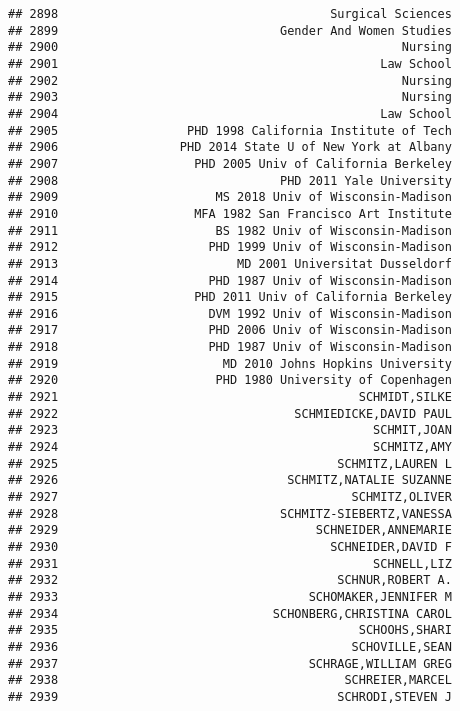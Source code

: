 \documentclass[
]{article}
\begin{document}
\begin{verbatim}
## 2898                                      Surgical Sciences
## 2899                               Gender And Women Studies
## 2900                                                Nursing
## 2901                                             Law School
## 2902                                                Nursing
## 2903                                                Nursing
## 2904                                             Law School
## 2905                  PHD 1998 California Institute of Tech
## 2906                 PHD 2014 State U of New York at Albany
## 2907                   PHD 2005 Univ of California Berkeley
## 2908                               PHD 2011 Yale University
## 2909                      MS 2018 Univ of Wisconsin-Madison
## 2910                   MFA 1982 San Francisco Art Institute
## 2911                      BS 1982 Univ of Wisconsin-Madison
## 2912                     PHD 1999 Univ of Wisconsin-Madison
## 2913                         MD 2001 Universitat Dusseldorf
## 2914                     PHD 1987 Univ of Wisconsin-Madison
## 2915                   PHD 2011 Univ of California Berkeley
## 2916                     DVM 1992 Univ of Wisconsin-Madison
## 2917                     PHD 2006 Univ of Wisconsin-Madison
## 2918                     PHD 1987 Univ of Wisconsin-Madison
## 2919                       MD 2010 Johns Hopkins University
## 2920                      PHD 1980 University of Copenhagen
## 2921                                          SCHMIDT,SILKE
## 2922                                 SCHMIEDICKE,DAVID PAUL
## 2923                                            SCHMIT,JOAN
## 2924                                            SCHMITZ,AMY
## 2925                                       SCHMITZ,LAUREN L
## 2926                                SCHMITZ,NATALIE SUZANNE
## 2927                                         SCHMITZ,OLIVER
## 2928                               SCHMITZ-SIEBERTZ,VANESSA
## 2929                                    SCHNEIDER,ANNEMARIE
## 2930                                      SCHNEIDER,DAVID F
## 2931                                            SCHNELL,LIZ
## 2932                                       SCHNUR,ROBERT A.
## 2933                                   SCHOMAKER,JENNIFER M
## 2934                              SCHONBERG,CHRISTINA CAROL
## 2935                                          SCHOOHS,SHARI
## 2936                                         SCHOVILLE,SEAN
## 2937                                   SCHRAGE,WILLIAM GREG
## 2938                                        SCHREIER,MARCEL
## 2939                                       SCHRODI,STEVEN J

\end{verbatim}
\end{document}
